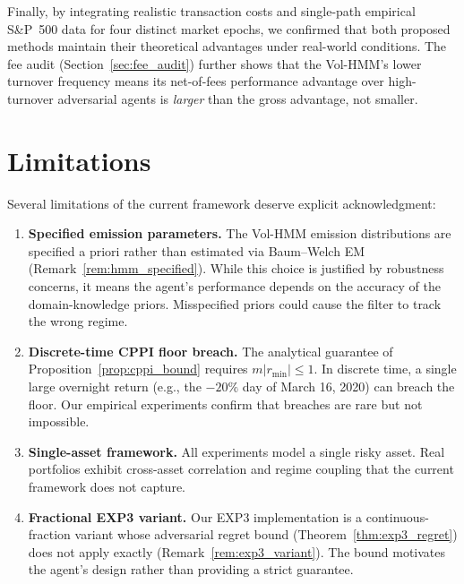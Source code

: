 Finally, by integrating realistic transaction costs and single-path empirical
S\&P~500 data for four distinct market epochs, we confirmed that both proposed
methods maintain their theoretical advantages under real-world conditions.
The fee audit (Section~\ref{sec:fee_audit}) further shows that the Vol-HMM's
lower turnover frequency means its net-of-fees performance advantage over
high-turnover adversarial agents is \emph{larger} than the gross advantage,
not smaller.

\section{Limitations}

Several limitations of the current framework deserve explicit acknowledgment:

\begin{enumerate}
    \item \textbf{Specified emission parameters.}  The Vol-HMM emission
    distributions are specified a priori rather than estimated via
    Baum--Welch EM (Remark~\ref{rem:hmm_specified}).  While this choice
    is justified by robustness concerns, it means the agent's performance
    depends on the accuracy of the domain-knowledge priors.  Misspecified
    priors could cause the filter to track the wrong regime.

    \item \textbf{Discrete-time CPPI floor breach.}  The analytical guarantee
    of Proposition~\ref{prop:cppi_bound} requires $m|r_{\min}|\leq 1$.  In
    discrete time, a single large overnight return (e.g., the $-20\%$ day of
    March 16, 2020) can breach the floor.  Our empirical experiments confirm
    that breaches are rare but not impossible.

    \item \textbf{Single-asset framework.}  All experiments model a single
    risky asset.  Real portfolios exhibit cross-asset correlation and
    regime coupling that the current framework does not capture.

    \item \textbf{Fractional EXP3 variant.}  Our EXP3 implementation is a
    continuous-fraction variant whose adversarial regret bound
    (Theorem~\ref{thm:exp3_regret}) does not apply exactly
    (Remark~\ref{rem:exp3_variant}).  The bound motivates the agent's design
    rather than providing a strict guarantee.
\end{enumerate}

